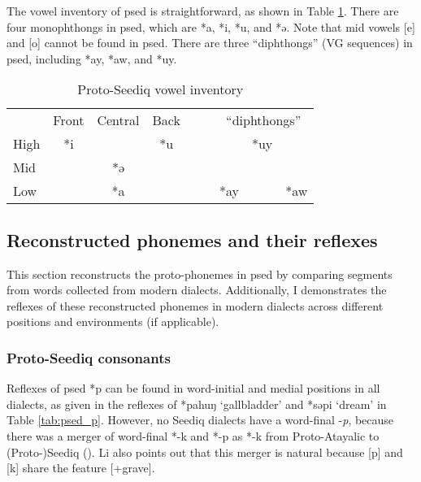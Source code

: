 The vowel inventory of \acl{psed} is straightforward, as shown in Table \ref{tab:psedV}. There are four monophthongs in \acl{psed}, which are *a, *i, *u, and *ə. Note that mid vowels [e] and [o] cannot be found in \acl{psed}. There are three ``diphthongs'' (VG sequences) in \acl{psed}, including *ay, *aw, and *uy. 

\begin{table}[!htbp]
\centering
\caption{Proto-Seediq vowel inventory}
\label{tab:psedV}
\begin{tabular}{lcccccccc}
\cline{1-4} \cline{7-9}
     & Front & Central & Back &  &  & \multicolumn{3}{c}{``diphthongs''} \\ \cline{1-4} \cline{7-9}
High & *i    &         & *u   &  &  &            & *uy       &           \\
Mid  &       & *ə      &      &  &  &            &           &           \\
Low  &       & *a      &      &  &  & *ay        &           & *aw       \\ \cline{1-4} \cline{7-9}
\end{tabular}
\end{table}

\subsection{Reconstructed phonemes and their reflexes}

This section reconstructs the proto-phonemes in \acl{psed} by comparing segments from words collected from modern dialects. Additionally, I demonstrates the reflexes of these reconstructed phonemes in modern dialects across different positions and environments (if applicable).

\subsubsection{Proto-Seediq consonants} \label{sec:psedC}


Reflexes of \acl{psed} *p can be found in word-initial and medial positions in all dialects, as given in the reflexes of *pahuŋ `gallbladder' and *səpi `dream' in Table \ref{tab:psed_p}. However, no Seediq dialects have a word-final -\textit{p}, because there was a merger of word-final *-k and *-p as *-k from Proto-Atayalic to (Proto-)Seediq (\cite{li1981paic}). Li also points out that this merger is natural because [p] and [k] share the feature [+grave]. 

